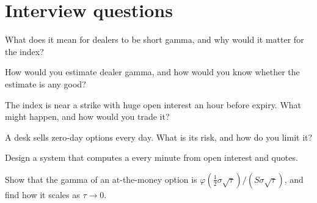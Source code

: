 \section{Interview questions}

\begin{interviewq}\label{iq:s2:zero-day-options-and-dealer-gamma-flows:1}
What does it mean for dealers to be short gamma, and why would it matter for the index?
\end{interviewq}

\begin{interviewq}\label{iq:s2:zero-day-options-and-dealer-gamma-flows:2}
How would you estimate dealer gamma, and how would you know whether the estimate is any good?
\end{interviewq}

\begin{interviewq}\label{iq:s2:zero-day-options-and-dealer-gamma-flows:3}
The index is near a strike with huge open interest an hour before expiry. What might happen, and how would you trade it?
\end{interviewq}

\begin{interviewq}\label{iq:s2:zero-day-options-and-dealer-gamma-flows:4}
A desk sells zero-day options every day. What is its risk, and how do you limit it?
\end{interviewq}

\begin{interviewq}\label{iq:s2:zero-day-options-and-dealer-gamma-flows:5}
Design a system that computes a  every minute from open interest and quotes.
\end{interviewq}

\begin{interviewq}\label{iq:s2:zero-day-options-and-dealer-gamma-flows:6}
Show that the gamma of an at-the-money option is $\varphi(\tfrac12\sigma\sqrt\tau)/(S\sigma\sqrt\tau)$, and find how it scales as $\tau \to 0$.
\end{interviewq}
